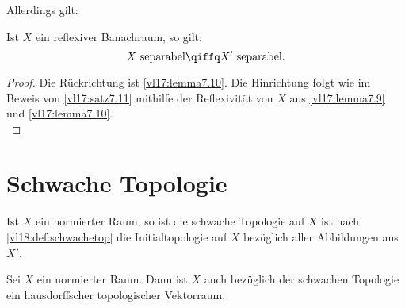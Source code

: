 Allerdings gilt:

\begin{thLemma}
    Ist $X$ ein reflexiver Banachraum, so gilt:
    \[ X\text{ separabel} \qiffq X'\text{ separabel}  . \]
\end{thLemma}

\begin{proof}
    Die Rückrichtung ist \cref{vl17:lemma7.10}. Die Hinrichtung folgt wie im
    Beweis von \cref{vl17:satz7.11} mithilfe der Reflexivität von $X$ aus
    \cref{vl17:lemma7.9} und \cref{vl17:lemma7.10}.
    \\
\end{proof}

\section{Schwache Topologie}
Ist $X$ ein normierter Raum, so ist die schwache Topologie auf $X$ ist nach
\cref{vl18:def:schwachetop} die Initialtopologie auf $X$ bezüglich aller
Abbildungen aus $X'$.

\begin{thSatz}
    \label{a:schwachetopovekt}%
    Sei $X$ ein normierter Raum. Dann ist $X$ auch bezüglich der schwachen
    Topologie ein hausdorffscher topologischer Vektorraum.
\end{thSatz}

